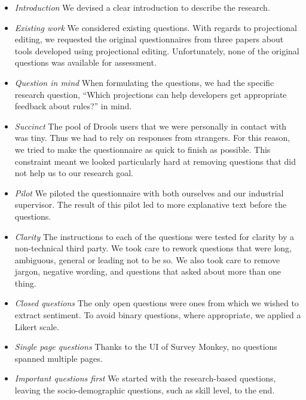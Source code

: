 \begin{itemize}    
    \setlength\itemsep{0em}
    \item \emph{Introduction} 
        We devised a clear introduction to describe the research.
    \item \emph{Existing work} 
        We considered existing questions.
        With regards to projectional editing, we requested the original questionnaires from three papers\cite{meacham2020adaptivevle,berger2016efficiency, voelter2014towards} about tools developed using projectional editing.
        Unfortunately, none of the original questions was available for assessment.
    \item \emph{Question in mind} 
        When formulating the questions, we had the specific research question, ``Which projections can help developers get appropriate feedback about rules?'' in mind.
    \item \emph{Succinct} 
        The pool of Drools users that we were personally in contact with was tiny.
        Thus we had to rely on responses from strangers.
        For this reason, we tried to make the questionnaire as quick to finish as possible.
        This constraint meant we looked particularly hard at removing questions that did not help us to our research goal.
    \item \emph{Pilot} 
        We piloted the questionnaire with both ourselves and our industrial supervisor. 
        The result of this pilot led to more explanative text before the questions.
    \item \emph{Clarity} 
        The instructions to each of the questions were tested for clarity by a non-technical third party.
        We took care to rework questions that were long, ambiguous, general or leading not to be so.
        We also took care to remove jargon, negative wording, and questions that asked about more than one thing.
    \item \emph{Closed questions} 
        The only open questions were ones from which we wished to extract sentiment.
        To avoid binary questions, where appropriate, we applied a Likert scale\cite{likert1932technique}.
    \item \emph{Single page questions} 
        Thanks to the UI of Survey Monkey, no questions spanned multiple pages.
    \item \emph{Important questions first} 
        We started with the research-based questions, leaving the socio-demographic questions, such as skill level, to the end.
\end{itemize}

